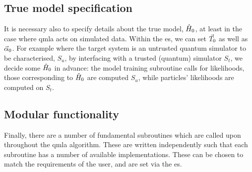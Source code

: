 \subsection{True model specification}
It is necessary also to specify details about the \gls{true model}, $\hat{H}_0$, 
    at least in the case where \gls{qmla} acts on simulated data. 
Within the \gls{es}, we can set ${ \vec{T} }_0$ as well as $\vec{\alpha}_0$. 
For example where the target system is an untrusted quantum simulator to be characterised, 
    $S_u$, by interfacing with a trusted (quantum) simulator $S_t$, 
    we decide some $\hat{H}_0$ in advance:
    the model training subroutine calls for \glspl{likelihood}, 
    those corresponding to $\hat{H}_0$ are computed $S_u$, 
    while \glspl{particle}' \glspl{likelihood} are computed on $S_t$. 

\subsection{Modular functionality}\label{sec:modular_functionality}
Finally, there are a number of fundamental subroutines which are called upon throughout the \gls{qmla} algorithm. 
These are written independently such that each subroutine has a number of available implementations. 
These can be chosen to match the requirements of the user, and are set via the \gls{es}. 

